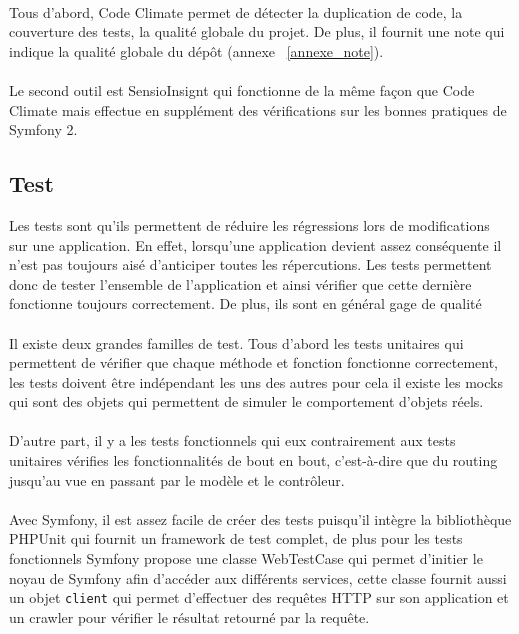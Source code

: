 \paragraph{}
Tous d'abord, Code Climate permet de détecter la duplication de code, la couverture des tests, la qualité globale du projet. De plus, il fournit une note qui indique la qualité globale du dépôt (annexe ~\ref{annexe_note}). 
\paragraph{}
Le second outil est SensioInsignt qui fonctionne de la même façon que Code Climate mais effectue en supplément des vérifications sur les bonnes pratiques de Symfony 2.
\subsection{Test}
Les tests sont qu'ils permettent de réduire les régressions lors de  modifications sur une application. En effet, lorsqu'une application devient assez conséquente il n'est pas toujours aisé d'anticiper toutes les répercutions. Les tests permettent donc de tester l'ensemble de l'application et ainsi vérifier que cette dernière fonctionne toujours correctement.
De plus, ils sont en général gage de qualité
 \paragraph{}
 Il existe deux grandes familles de test. Tous d'abord les tests unitaires qui permettent de vérifier que chaque méthode et fonction fonctionne correctement, les tests doivent être indépendant les uns des autres pour cela il existe les mocks qui sont des objets qui permettent de simuler le comportement d'objets \og{}réels\fg{}.
  \paragraph{}
 D'autre part, il y a les tests fonctionnels qui eux contrairement aux tests unitaires vérifies les fonctionnalités de bout en bout, c'est-à-dire que du routing jusqu'au vue en passant par le modèle et le contrôleur.
  \paragraph{}
 Avec Symfony, il est assez facile de créer des tests puisqu'il intègre la bibliothèque PHPUnit qui fournit un framework de test complet, de plus pour les tests fonctionnels Symfony propose une classe WebTestCase qui permet d'initier le noyau de Symfony afin d'accéder aux différents services, cette classe fournit aussi un objet \verb?client? qui permet d'effectuer des requêtes HTTP sur son application et un crawler pour vérifier le résultat retourné par la requête.
